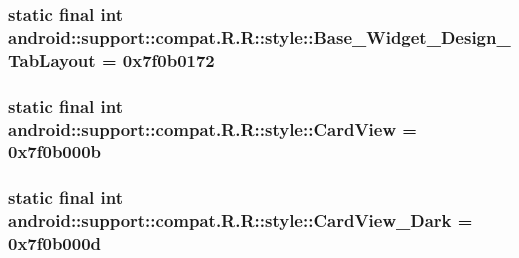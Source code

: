 \hypertarget{classandroid_1_1support_1_1compat_1_1_r_1_1style_1eab05d40fc003312ca3c438585010ba}{
\subsubsection[{Base\_\-Widget\_\-Design\_\-TabLayout}]{\setlength{\rightskip}{0pt plus 5cm}static final int android::support::compat.R.R::style::Base\_\-Widget\_\-Design\_\-TabLayout = 0x7f0b0172}}
\label{classandroid_1_1support_1_1compat_1_1_r_1_1style_1eab05d40fc003312ca3c438585010ba}


\hypertarget{classandroid_1_1support_1_1compat_1_1_r_1_1style_721207380fc1f0385568f979af7cd378}{
\subsubsection[{CardView}]{\setlength{\rightskip}{0pt plus 5cm}static final int android::support::compat.R.R::style::CardView = 0x7f0b000b}}
\label{classandroid_1_1support_1_1compat_1_1_r_1_1style_721207380fc1f0385568f979af7cd378}


\hypertarget{classandroid_1_1support_1_1compat_1_1_r_1_1style_427c458b6399e85179d6d66a60db6525}{
\subsubsection[{CardView\_\-Dark}]{\setlength{\rightskip}{0pt plus 5cm}static final int android::support::compat.R.R::style::CardView\_\-Dark = 0x7f0b000d}}
\label{classandroid_1_1support_1_1compat_1_1_r_1_1style_427c458b6399e85179d6d66a60db6525}


